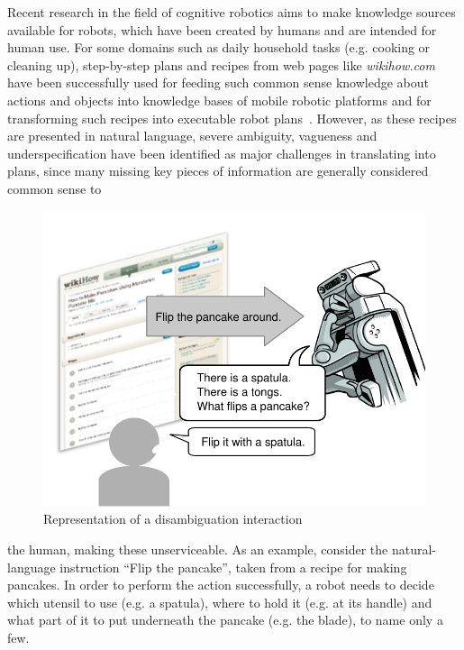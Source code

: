 \documentclass[oribibl]{llncs}
\begin{document}
Recent research in the field of cognitive robotics aims to make 
knowledge sources available for robots, which have been created by 
humans and are intended for human use. For some domains such as 
daily household tasks (e.g. cooking or cleaning up), step-by-step 
plans and recipes from web pages like \textit 
{wikihow.com} have been successfully used for feeding such common 
sense knowledge about actions and objects into knowledge bases of 
mobile robotic platforms and for transforming such recipes into 
executable robot plans~\cite{tenorth10webinstructions}. However, as 
these recipes are presented in natural language, severe ambiguity, 
vagueness and underspecification have been identified as major 
challenges in translating into plans, since many missing 
key pieces of information are generally considered common sense to 
\begin{figure}[t]
\centering
\includegraphics[scale=0.51, trim = 0mm 0mm 0mm 8mm]{human_robot.pdf}
\caption{Representation of a disambiguation interaction}
\label{fig:application}
\end{figure} 
the human, making these unserviceable.
As an example, consider the natural-language instruction ``Flip the 
pancake'', taken from a recipe for making pancakes. 
In order to perform the action successfully, a robot needs to decide 
which utensil to use (e.g. a spatula), where to hold it (e.g. at its 
handle) and what part of it to put underneath the pancake (e.g. the 
blade), to name only a few.
\end{document}
